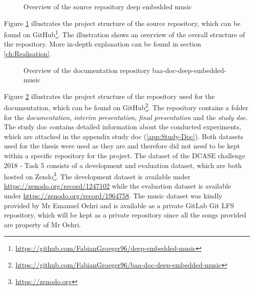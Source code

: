 \begin{figure}[ht]
\caption{Overview of the source repository \flqq deep embedded music\frqq}
\label{fig:Project-Overview-Source}
\end{figure}
\noindent
Figure \ref{fig:Project-Overview-Source} illustrates the project structure of the source repository, which can be found on GitHub\footnote{\url{https://github.com/FabianGroeger96/deep-embedded-music}}. The illustration shows an overview of the overall structure of the repository. More in-depth explanation can be found in section \ref{ch:Realisation}.

\begin{figure}[ht]
\caption{Overview of the documentation repository \flqq baa-doc-deep-embedded-music\frqq}
\label{fig:Project-Overview-Documentation}
\end{figure}
\noindent
Figure \ref{fig:Project-Overview-Documentation} illustrates the project structure of the repository used for the documentation, which can be found on GitHub\footnote{\url{https://github.com/FabianGroeger96/baa-doc-deep-embedded-music}}. The repository contains a folder for the \textit{documentation}, \textit{interim presentation}, \textit{final presentation} and the \textit{study doc}. The study doc contains detailed information about the conducted experiments, which are attached in the appendix study doc (\ref{app:Study-Doc}).
\newline
\newline
Both datasets used for the thesis were used as they are and therefore did not need to be kept within a specific repository for the project. The dataset of the DCASE challenge 2018 - Task 5 consists of a development and evaluation dataset, which are both hosted on Zendo\footnote{\url{https://zenodo.org}}. The development dataset is available under \url{https://zenodo.org/record/1247102} while the evaluation dataset is available under \url{https://zenodo.org/record/1964758}. 
\newline
\newline
The music dataset was kindly provided by Mr Emanuel Oehri and is available as a private GitLab Git LFS repository, which will be kept as a private repository since all the songs provided are property of Mr Oehri.

